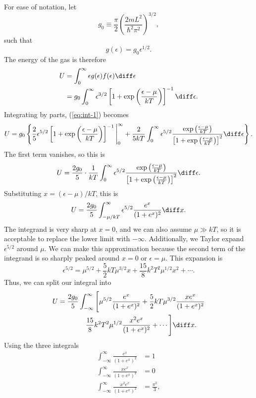 \documentclass[12pt]{article}
\begin{document}
For ease of notation, let 
\[
	g_0 \equiv \frac{\pi}{2} \left( \frac{2mL^2}{\hbar^2 \pi^2} \right)^{3/2},
\]
such that
\[
	g(\epsilon) = g_0 \epsilon^{1/2}.
\]
The energy of the gas is therefore 
\begin{align}
	U &= \int_{0}^{\infty}\epsilon g(\epsilon) f(\epsilon) \diff \epsilon \\
	  &= g_0 \int_0^{\infty} \epsilon^{3/2} \left[ 1+\exp\left( \frac{\epsilon - \mu}{kT} \right) \right]^{-1} \diff \epsilon. \label{eq:int-1}
\end{align}
Integrating by parts, (\ref{eq:int-1}) becomes 
\begin{equation*}
	U = g_0 \left\{ \frac{2}{5}\epsilon^{5/2} \left[ 1+\exp\left( \frac{\epsilon - \mu}{kT} \right) \right]^{-1} \Bigg|_0^{\infty} + \frac{2}{5kT}\int_0^{\infty} \epsilon^{5/2} \frac{\exp\left( \frac{\epsilon - \mu}{kT} \right)}{\left[ 1+\exp\left( \frac{\epsilon - \mu}{kT} \right) \right]^{2}} \diff \epsilon \right\}.
\end{equation*}
The first term vanishes, so this is 
\[
	U = \frac{2g_0}{5}\cdot \frac{1}{kT} \int_0^{\infty}  \epsilon^{5/2} \frac{\exp\left( \frac{\epsilon - \mu}{kT} \right)}{\left[ 1+\exp\left( \frac{\epsilon - \mu}{kT} \right) \right]^{2}} \diff \epsilon. 
\]
Substituting $x = (\epsilon - \mu)/kT$, this is 
\[
	U = \frac{2g_0}{5} \int_{-\mu/kT}^{\infty} \epsilon^{5/2} \frac{e^x}{(1+e^x)^2} \diff x.
\]
The integrand is very sharp at $x = 0$, and we can also assume $\mu \gg kT$, so it is acceptable to replace the lower limit with $-\infty$.  Additionally, we Taylor expand $\epsilon^{5/2}$ around $\mu$.  We can make this approximation because the second term of the integrand is so sharply peaked around $x = 0$ or $\epsilon = \mu$.  This expansion is
\begin{equation}
	\epsilon^{5/2} = \mu^{5/2} + \frac{5}{2}kT\mu^{3/2}x + \frac{15}{8}k^2 T^2 \mu^{1/2} x^2 + \cdots.
\end{equation}
Thus, we can split our integral into 
\begin{align}
	U &= \frac{2g_0}{5}\int_{-\infty}^{\infty} \Bigg [ \mu^{5/2}\frac{e^x}{(1+e^x)^2}  + \frac{5}{2}kT\mu^{3/2} \frac{xe^x}{(1+e^x)^2} \nonumber \\
	  &\qquad \qquad \frac{15}{8} k^2 T^2 \mu^{1/2} \frac{x^2 e^x}{(1+e^x)^2} + \cdots \Bigg ] \diff x. 
\end{align}
Using the three integrals
\begin{align*}
	\int_{-\infty}^{\infty} \frac{e^x}{(1+e^x)^2} &= 1 \\
	\int_{-\infty}^{\infty} \frac{xe^x}{(1+e^x)^2} &= 0 \\
	\int_{-\infty}^{\infty} \frac{x^2e^x}{(1+e^x)^2} &= \frac{\pi^2}{3},
\end{align*}
\end{document}
